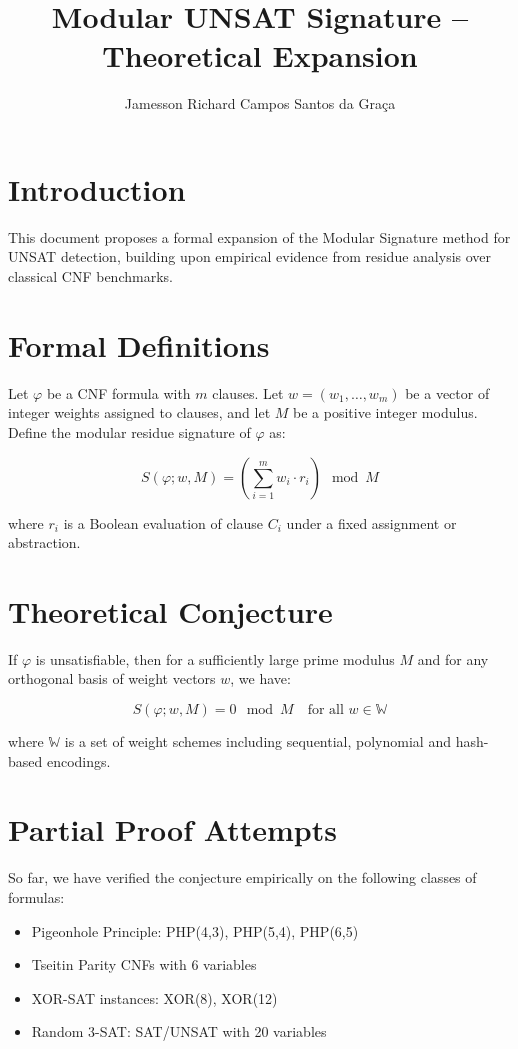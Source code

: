 \documentclass{article}
\title{Modular UNSAT Signature – Theoretical Expansion}
\author{Jamesson Richard Campos Santos da Graça}
\date{}
\begin{document}
\maketitle

\section{Introduction}
This document proposes a formal expansion of the Modular Signature method for UNSAT detection, building upon empirical evidence from residue analysis over classical CNF benchmarks.

\section{Formal Definitions}
Let $\varphi$ be a CNF formula with $m$ clauses. Let $w = (w_1, \dots, w_m)$ be a vector of integer weights assigned to clauses, and let $M$ be a positive integer modulus. Define the modular residue signature of $\varphi$ as:

\[
S(\varphi; w, M) = \left( \sum_{i=1}^{m} w_i \cdot r_i \right) \mod M
\]

where $r_i$ is a Boolean evaluation of clause $C_i$ under a fixed assignment or abstraction.

\section{Theoretical Conjecture}
If $\varphi$ is unsatisfiable, then for a sufficiently large prime modulus $M$ and for any orthogonal basis of weight vectors $w$, we have:

\[
S(\varphi; w, M) = 0 \mod M \quad \text{for all } w \in \mathbb{W}
\]

where $\mathbb{W}$ is a set of weight schemes including sequential, polynomial and hash-based encodings.

\section{Partial Proof Attempts}
So far, we have verified the conjecture empirically on the following classes of formulas:
\begin{itemize}
  \item Pigeonhole Principle: PHP(4,3), PHP(5,4), PHP(6,5)
  \item Tseitin Parity CNFs with 6 variables
  \item XOR-SAT instances: XOR(8), XOR(12)
  \item Random 3-SAT: SAT/UNSAT with 20 variables
\end{itemize}
\end{document}
